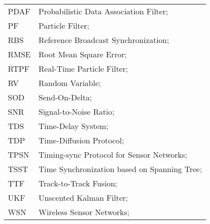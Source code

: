 \begin{longtable}{ll}
	PDAF		& Probabilistic Data Association Filter; \\
	PF 			& Particle Filter; \\
	RBS			& Reference Broadcast Synchronization; \\
	RMSE		& Root Mean Square Error; \\
	RTPF		& Real-Time Particle Filter; \\
	RV			& Random Variable; \\
	SOD			& Send-On-Delta; \\
	SNR			& Signal-to-Noise Ratio; \\
	TDS			& Time-Delay System; \\
	TDP			& Time-Diffusion Protocol; \\
	TPSN		& Timing-sync Protocol for Sensor Networks; \\
	TSST		& Time Synchronization based on Spanning Tree; \\
	TTF 		& Track-to-Track Fusion; \\
	UKF			& Unscented Kalman Filter; \\
	WSN			& Wireless Sensor Networks; \\
\end{longtable}

